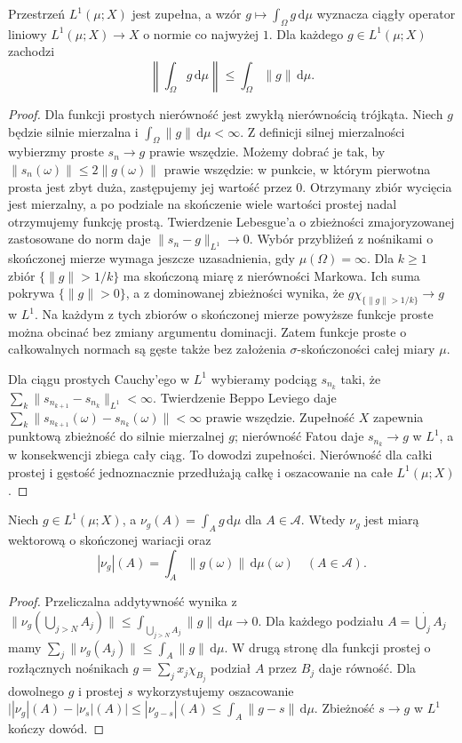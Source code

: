 \begin{twierdzenie}
\label{thm:bochner-basic-30}
Przestrzeń $L^1(\mu;X)$ jest zupełna, a wzór
$g\mapsto\int_\Omega g\,\mathrm d\mu$ wyznacza
ciągły operator liniowy $L^1(\mu;X)\to X$
o normie co najwyżej $1$. Dla każdego $g\in L^1(\mu;X)$
zachodzi
\[
 \left\|\int_\Omega g\,\mathrm d\mu\right\|
 \le\int_\Omega\|g\|\,\mathrm d\mu.
\]
\end{twierdzenie}
\begin{proof}
Dla funkcji prostych nierówność jest zwykłą nierównością
trójkąta. Niech $g$ będzie silnie mierzalna i
$\int_\Omega\|g\|\,\mathrm d\mu<\infty$.
Z definicji silnej mierzalności wybierzmy proste
$s_n\to g$ prawie wszędzie. Możemy dobrać je tak, by
$\|s_n(\omega)\|\le2\|g(\omega)\|$ prawie wszędzie:
w punkcie, w którym pierwotna prosta jest zbyt duża,
zastępujemy jej wartość przez $0$. Otrzymany zbiór
wycięcia jest mierzalny, a po podziale na skończenie
wiele wartości prostej nadal otrzymujemy funkcję prostą.
Twierdzenie Lebesgue'a o zbieżności zmajoryzowanej
zastosowane do norm daje $\|s_n-g\|_{L^1}\to0$.
Wybór przybliżeń z nośnikami o skończonej mierze
wymaga jeszcze uzasadnienia, gdy $\mu(\Omega)=\infty$.
Dla $k\ge1$ zbiór $\{\|g\|>1/k\}$ ma skończoną
miarę z nierówności Markowa. Ich suma pokrywa
$\{\|g\|>0\}$, a z dominowanej zbieżności wynika,
że $g\chi_{\{\|g\|>1/k\}}\to g$ w $L^1$.
Na każdym z tych zbiorów o skończonej mierze
powyższe funkcje proste można obcinać bez zmiany
argumentu dominacji. Zatem funkcje proste
o całkowalnych normach są gęste także bez
założenia $\sigma$-skończoności całej miary $\mu$.

Dla ciągu prostych Cauchy'ego w $L^1$ wybieramy
podciąg $s_{n_k}$ taki, że
$\sum_k\|s_{n_{k+1}}-s_{n_k}\|_{L^1}<\infty$.
Twierdzenie Beppo Leviego daje
$\sum_k\|s_{n_{k+1}}(\omega)-s_{n_k}(\omega)\|<\infty$
prawie wszędzie. Zupełność $X$ zapewnia punktową
zbieżność do silnie mierzalnej $g$; nierówność Fatou
daje $s_{n_k}\to g$ w $L^1$, a w konsekwencji zbiega
cały ciąg. To dowodzi zupełności. Nierówność dla całki
prostej i gęstość jednoznacznie przedłużają całkę
i oszacowanie na całe $L^1(\mu;X)$.
\end{proof}

\begin{twierdzenie}
\label{thm:variation-density-30}
Niech $g\in L^1(\mu;X)$, a
$\nu_g(A)=\int_Ag\,\mathrm d\mu$ dla $A\in\mathcal A$.
Wtedy $\nu_g$ jest miarą wektorową o skończonej wariacji
oraz
\[
 |\nu_g|(A)=\int_A\|g(\omega)\|\,\mathrm d\mu(\omega)
 \quad(A\in\mathcal A).
\]
\end{twierdzenie}
\begin{proof}
Przeliczalna addytywność wynika z
$\|\nu_g(\bigcup_{j>N}A_j)\|
\le\int_{\bigcup_{j>N}A_j}\|g\|\,\mathrm d\mu\to0$.
Dla każdego podziału $A=\dot\bigcup_jA_j$ mamy
$\sum_j\|\nu_g(A_j)\|\le\int_A\|g\|\,\mathrm d\mu$.
W drugą stronę dla funkcji prostej o rozłącznych
nośnikach $g=\sum_jx_j\chi_{B_j}$ podział $A$ przez
$B_j$ daje równość. Dla dowolnego $g$ i prostej $s$
wykorzystujemy oszacowanie
$\big||\nu_g|(A)-|\nu_s|(A)\big|
\le|\nu_{g-s}|(A)\le\int_A\|g-s\|\,\mathrm d\mu$.
Zbieżność $s\to g$ w $L^1$ kończy dowód.
\end{proof}

